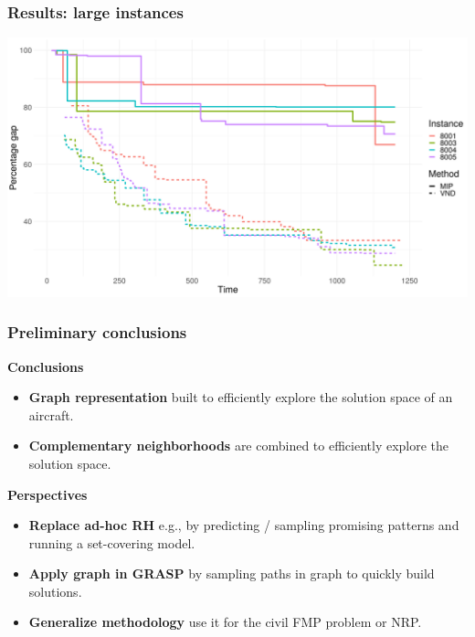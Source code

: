 \begin{frame}
\frametitle{\textbf{Results: large instances}}
  \includegraphics[width=\linewidth]{images/progress_gaps_very_large_255.png}  
\end{frame}

\begin{frame}
\frametitle{\textbf{Preliminary conclusions}}
  \pause
  \begin{block}{\textbf{Conclusions}}
    \begin{itemize}[<+->]
    \item \textbf{Graph representation} 
      built to efficiently explore the solution space of an aircraft.
    \item \textbf{Complementary neighborhoods} 
      are combined to efficiently explore the solution space.
    \end{itemize}
  \end{block}  
  \pause
  \begin{block}{\textbf{Perspectives}}
    \begin{itemize}[<+->]
      \item \textbf{Replace ad-hoc RH}
        e.g., by predicting / sampling promising patterns and running a set-covering model.
      \item \textbf{Apply graph in GRASP}
        by sampling paths in graph to quickly build solutions.
      \item \textbf{Generalize methodology}
        use it for the civil FMP problem or NRP.
    \end{itemize}
  \end{block}  
  
\end{frame}

